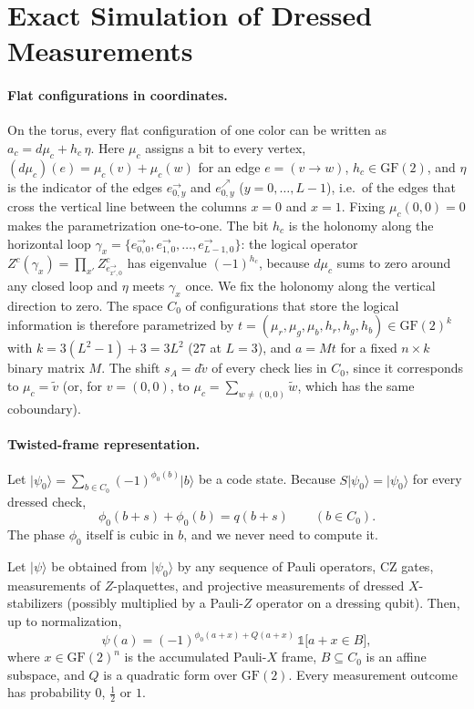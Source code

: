 \documentclass[a4paper]{article}
\newcommand{\rd}{r}
\newcommand{\gr}{g}
\newcommand{\bl}{b}
\newcommand{\GF}{\mathrm{GF}(2)}
\providecommand{\ket}[1]{\ensuremath{|#1\rangle}}
\newcommand{\eh}[1]{e^{\rightarrow}_{#1}}   %
\newcommand{\ed}[1]{e^{\nearrow}_{#1}}      %
\begin{document}
\section{Exact Simulation of Dressed Measurements}
\label{sec:method}

\paragraph{Flat configurations in coordinates.}
On the torus, every flat configuration of one color can be written as $a_c=d\mu_c+h_c\,\eta$. Here $\mu_c$ assigns a bit to every vertex, $(d\mu_c)(e)=\mu_c(v)+\mu_c(w)$ for an edge $e=(v\to w)$, $h_c\in\GF$, and $\eta$ is the indicator of the edges $\eh{0,y}$ and $\ed{0,y}$ ($y=0,\dots,L-1$), i.e.\ of the edges that cross the vertical line between the columns $x=0$ and $x=1$. Fixing $\mu_c(0,0)=0$ makes the parametrization one-to-one. The bit $h_c$ is the holonomy along the horizontal loop $\gamma_x=\{\eh{0,0},\eh{1,0},\dots,\eh{L-1,0}\}$: the logical operator $Z^c(\gamma_x)=\prod_{x'}Z^c_{\eh{x',0}}$ has eigenvalue $(-1)^{h_c}$, because $d\mu_c$ sums to zero around any closed loop and $\eta$ meets $\gamma_x$ once. We fix the holonomy along the vertical direction to zero. The space $C_0$ of configurations that store the logical information is therefore parametrized by $t=(\mu_\rd,\mu_\gr,\mu_\bl,h_\rd,h_\gr,h_\bl)\in\GF^k$ with $k=3(L^2-1)+3=3L^2$ (27 at $L=3$), and $a=Mt$ for a fixed $n\times k$ binary matrix $M$. The shift $s_A=d\tilde v$ of every check lies in $C_0$, since it corresponds to $\mu_c=\tilde v$ (or, for $v=(0,0)$, to $\mu_c=\sum_{w\neq(0,0)}\tilde w$, which has the same coboundary).

\paragraph{Twisted-frame representation.}
Let $\ket{\psi_0}=\sum_{b\in C_0}(-1)^{\phi_0(b)}\ket{b}$ be a code state. Because $S\ket{\psi_0}=\ket{\psi_0}$ for every dressed check,
\begin{equation}
  \phi_0(b+s)+\phi_0(b)=q(b+s)\qquad(b\in C_0).
  \label{eq:stabcond}
\end{equation}
The phase $\phi_0$ itself is cubic in $b$, and we never need to compute it.

\begin{proposition}
Let $\ket{\psi}$ be obtained from $\ket{\psi_0}$ by any sequence of Pauli operators, CZ gates, measurements of $Z$-plaquettes, and projective measurements of dressed $X$-stabilizers (possibly multiplied by a Pauli-$Z$ operator on a dressing qubit). Then, up to normalization,
\begin{equation}
  \psi(a)=(-1)^{\phi_0(a+x)+Q(a+x)}\,\mathds{1}\big[a+x\in B\big],
  \label{eq:tf}
\end{equation}
where $x\in\GF^{n}$ is the accumulated Pauli-$X$ frame, $B\subseteq C_0$ is an affine subspace, and $Q$ is a quadratic form over $\GF$. Every measurement outcome has probability $0$, $\tfrac12$ or $1$.
\end{proposition}
\end{document}
